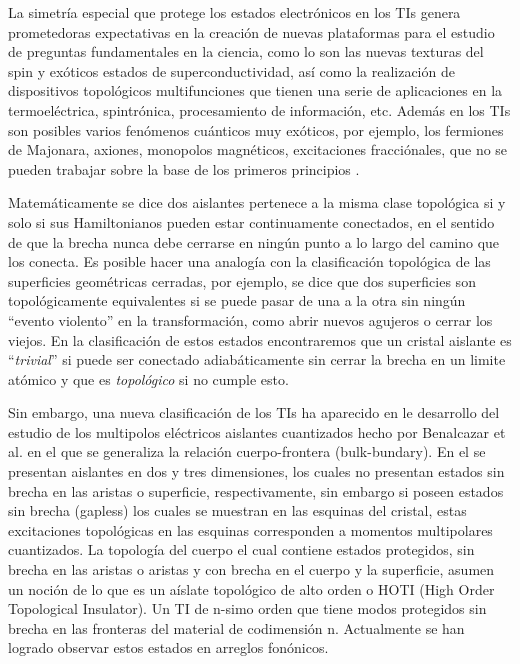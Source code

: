 La simetría especial que protege los estados electrónicos en los TIs genera prometedoras expectativas  en la creación de nuevas plataformas para el estudio de preguntas fundamentales en la ciencia, como lo son las nuevas texturas del spin y exóticos estados de superconductividad,  así como la realización de dispositivos topológicos multifunciones que tienen una serie de aplicaciones en la termoeléctrica, spintrónica, procesamiento de información, etc. Además en los TIs son posibles varios fenómenos cuánticos muy exóticos, por ejemplo, los fermiones de Majonara, axiones, monopolos magnéticos, excitaciones fracciónales, que no se pueden trabajar sobre la base de los primeros principios \cite{Moore2010}.

Matemáticamente se dice dos aislantes pertenece a la misma clase topológica si y solo si sus Hamiltonianos pueden estar continuamente conectados, en el sentido de que la brecha nunca debe cerrarse en ningún punto a lo largo del camino que los conecta. Es posible hacer una analogía con la clasificación topológica de las superficies geométricas cerradas, por ejemplo, se dice que dos superficies son topológicamente equivalentes si se puede pasar de una a la otra sin ningún ``evento violento'' en la transformación, como abrir nuevos agujeros o cerrar los viejos. En la clasificación de estos estados encontraremos que un cristal aislante es ``\textit{trivial}'' si puede ser conectado adiabáticamente sin cerrar la brecha en un limite atómico y que es \textit{topológico} si no cumple esto.

Sin embargo, una nueva clasificación de los TIs ha aparecido en le desarrollo del estudio de los multipolos eléctricos aislantes cuantizados hecho por Benalcazar et al. \cite{Benalcazar2017}    en el que se generaliza la relación cuerpo-frontera (bulk-bundary). En el se presentan aislantes en dos y tres dimensiones, los cuales no presentan estados sin brecha en las aristas o superficie, respectivamente, sin embargo si poseen estados sin brecha (gapless) los cuales se muestran en las esquinas del cristal, estas excitaciones topológicas en las esquinas corresponden a momentos multipolares cuantizados.
La topología del cuerpo el cual contiene estados protegidos, sin brecha en las aristas o aristas y con brecha en el cuerpo y la superficie, asumen un noción de lo que es un aíslate topológico de alto orden o HOTI (High Order Topological Insulator). Un TI de n-simo orden que tiene modos protegidos sin brecha en las fronteras del material de codimensión n. Actualmente se han logrado observar estos estados en arreglos fonónicos.

